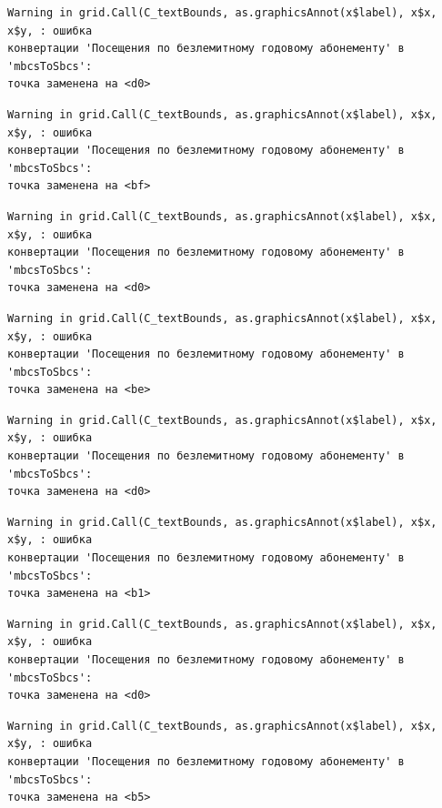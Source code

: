 \documentclass[
  letterpaper,
  DIV=11,
  numbers=noendperiod]{scrreprt}
\begin{document}
\begin{verbatim}
Warning in grid.Call(C_textBounds, as.graphicsAnnot(x$label), x$x, x$y, : ошибка
конвертации 'Посещения по безлемитному годовому абонементу' в 'mbcsToSbcs':
точка заменена на <d0>
\end{verbatim}

\begin{verbatim}
Warning in grid.Call(C_textBounds, as.graphicsAnnot(x$label), x$x, x$y, : ошибка
конвертации 'Посещения по безлемитному годовому абонементу' в 'mbcsToSbcs':
точка заменена на <bf>
\end{verbatim}

\begin{verbatim}
Warning in grid.Call(C_textBounds, as.graphicsAnnot(x$label), x$x, x$y, : ошибка
конвертации 'Посещения по безлемитному годовому абонементу' в 'mbcsToSbcs':
точка заменена на <d0>
\end{verbatim}

\begin{verbatim}
Warning in grid.Call(C_textBounds, as.graphicsAnnot(x$label), x$x, x$y, : ошибка
конвертации 'Посещения по безлемитному годовому абонементу' в 'mbcsToSbcs':
точка заменена на <be>
\end{verbatim}

\begin{verbatim}
Warning in grid.Call(C_textBounds, as.graphicsAnnot(x$label), x$x, x$y, : ошибка
конвертации 'Посещения по безлемитному годовому абонементу' в 'mbcsToSbcs':
точка заменена на <d0>
\end{verbatim}

\begin{verbatim}
Warning in grid.Call(C_textBounds, as.graphicsAnnot(x$label), x$x, x$y, : ошибка
конвертации 'Посещения по безлемитному годовому абонементу' в 'mbcsToSbcs':
точка заменена на <b1>
\end{verbatim}

\begin{verbatim}
Warning in grid.Call(C_textBounds, as.graphicsAnnot(x$label), x$x, x$y, : ошибка
конвертации 'Посещения по безлемитному годовому абонементу' в 'mbcsToSbcs':
точка заменена на <d0>
\end{verbatim}

\begin{verbatim}
Warning in grid.Call(C_textBounds, as.graphicsAnnot(x$label), x$x, x$y, : ошибка
конвертации 'Посещения по безлемитному годовому абонементу' в 'mbcsToSbcs':
точка заменена на <b5>
\end{verbatim}
\end{document}
